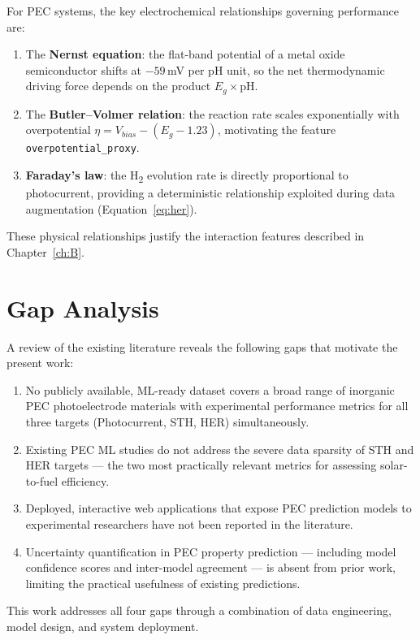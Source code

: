 For PEC systems, the key electrochemical relationships governing performance are:

\begin{enumerate}
  \item The \textbf{Nernst equation}: the flat-band potential of a metal oxide
        semiconductor shifts at $-59$\,mV per pH unit, so the net thermodynamic
        driving force depends on the product $E_g \times \text{pH}$.
  \item The \textbf{Butler--Volmer relation}: the reaction rate scales
        exponentially with overpotential $\eta = V_{bias} - (E_g - 1.23)$,
        motivating the feature \texttt{overpotential\_proxy}.
  \item \textbf{Faraday's law}: the H\textsubscript{2} evolution rate is
        directly proportional to photocurrent, providing a deterministic
        relationship exploited during data augmentation
        (Equation~\eqref{eq:her}).
\end{enumerate}

These physical relationships justify the interaction features described in
Chapter~\ref{ch:B}.

\section{Gap Analysis}

A review of the existing literature reveals the following gaps that motivate
the present work:

\begin{enumerate}
  \item No publicly available, ML-ready dataset covers a broad range of
        inorganic PEC photoelectrode materials with experimental performance
        metrics for all three targets (Photocurrent, STH, HER) simultaneously.

  \item Existing PEC ML studies do not address the severe data sparsity of
        STH and HER targets --- the two most practically relevant metrics
        for assessing solar-to-fuel efficiency.

  \item Deployed, interactive web applications that expose PEC prediction
        models to experimental researchers have not been reported in the
        literature.

  \item Uncertainty quantification in PEC property prediction --- including
        model confidence scores and inter-model agreement --- is absent from
        prior work, limiting the practical usefulness of existing predictions.
\end{enumerate}

This work addresses all four gaps through a combination of data engineering,
model design, and system deployment.
